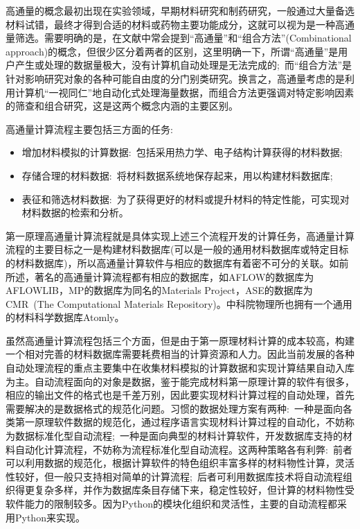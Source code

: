 高通量的概念最初出现在实验领域，早期材料研究和制药研究，一般通过大量备选材料试错，最终才得到合适的材料或药物主要功能成分，这就可以视为是一种高通量筛选。需要明确的是，在文献中常会提到“高通量”和“组合方法”(\textrm{Combinational approach})的概念，但很少区分着两者的区别，这里明确一下，所谓“高通量”是用户产生或处理的数据量极大，没有计算机自动处理是无法完成的;~而“组合方法”是针对影响研究对象的各种可能自由度的分门别类研究。换言之，高通量考虑的是利用计算机“一视同仁”地自动化式处理海量数据，而组合方法更强调对特定影响因素的筛查和组合研究，这是这两个概念内涵的主要区别。

高通量计算流程主要包括三方面的任务:
\begin{itemize}
	\item 增加材料模拟的计算数据:~包括采用热力学、电子结构计算获得的材料数据;
	\item 存储合理的材料数据:~将材料数据系统地保存起来，用以构建材料数据库;
	\item 表征和筛选材料数据:~为了获得更好的材料或提升材料的特定性能，可实现对材料数据的检索和分析。
\end{itemize}
第一原理高通量计算流程就是具体实现上述三个流程开发的计算任务，高通量计算流程的主要目标之一是构建材料数据库(可以是一般的通用材料数据库或特定目标的材料数据库)，所以高通量计算软件与相应的数据库有着密不可分的关联。如前所述，著名的高通量计算流程都有相应的数据库，如\textrm{AFLOW}的数据库为\textrm{AFLOWLIB}，\textrm{MP}的数据库为同名的\textrm{Materials Project}，\textrm{ASE}的数据库为\textrm{CMR~(The Computational Materials Repository)}。中科院物理所也拥有一个通用的材料科学数据库\textrm{Atomly}。

虽然高通量计算流程包括三个方面，但是由于第一原理材料计算的成本较高，构建一个相对完善的材料数据库需要耗费相当的计算资源和人力。因此当前发展的各种自动处理流程的重点主要集中在收集材料模拟的计算数据和实现计算结果自动入库为主。自动流程面向的对象是数据，鉴于能完成材料第一原理计算的软件有很多，相应的输出文件的格式也是千差万别，因此要实现材料计算过程的自动处理，首先需要解决的是数据格式的规范化问题。习惯的数据处理方案有两种:~一种是面向各类第一原理软件数据的规范化，通过程序语言实现材料计算过程的自动化，不妨称为数据标准化型自动流程;~一种是面向典型的材料计算软件，开发数据库支持的材料自动化计算流程，不妨称为流程标准化型自动流程。这两种策略各有利弊:~前者可以利用数据的规范化，根据计算软件的特色组织丰富多样的材料物性计算，灵活性较好，但一般只支持相对简单的计算流程;~后者可利用数据库技术将自动流程组织得更复杂多样，并作为数据库条目存储下来，稳定性较好，但计算的材料物性受软件能力的限制较多。因为\textrm{Python}的模块化组织和灵活性，主要的自动流程都采用\textrm{Python}来实现。

